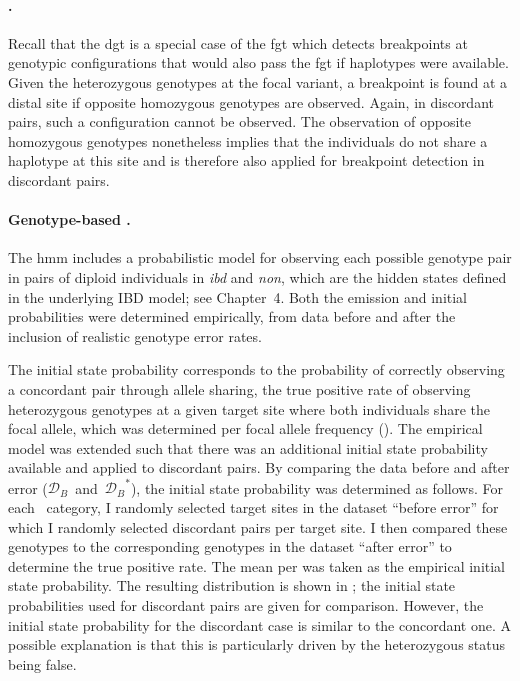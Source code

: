 \paragraph{.}
Recall that the \gls{dgt} is a special case of the \gls{fgt} which detects breakpoints at genotypic configurations that would also pass the \gls{fgt} if haplotypes were available.
Given the  heterozygous genotypes at the focal variant, a breakpoint is found at a distal site if opposite homozygous genotypes are observed.
Again, in discordant pairs, such a configuration cannot be observed.
The observation of opposite homozygous genotypes nonetheless implies that the  individuals do not share a haplotype at this site and is therefore also applied for breakpoint detection in discordant pairs.

%

%

\paragraph{Genotype-based .}
The \gls{hmm} includes a probabilistic model for observing each possible genotype pair in pairs of diploid individuals in \emph{ibd} and \emph{non}, which are the hidden states defined in the underlying IBD model; see Chapter~4.
Both the emission and initial probabilities were determined empirically, from data before and after the inclusion of realistic genotype error rates.

The initial state probability corresponds to the probability of correctly observing a concordant pair through allele sharing, \ie the true positive rate of observing heterozygous genotypes at a given target site where both individuals share the focal allele, which was determined per focal allele frequency (\fk{}).
The empirical model was extended such that there was an additional initial state probability available and applied to discordant pairs.
By comparing the data before and after error ($\mathcal{D}_B$~and~${\mathcal{D}_B}^{\ast}$), the initial state probability was determined as follows.
For each \fk{}~category, I randomly selected  target sites in the dataset ``before error'' for which I randomly selected  discordant pairs per target site.
I then compared these genotypes to the corresponding genotypes in the dataset ``after error'' to determine the true positive rate.
The mean per \fk{} was taken as the empirical initial state probability.
The resulting distribution is shown in ; the initial state probabilities used for discordant pairs are given for comparison.
However, the initial state probability for the discordant case is similar to the concordant one.
A possible explanation is that this is particularly driven by the heterozygous status being false.

